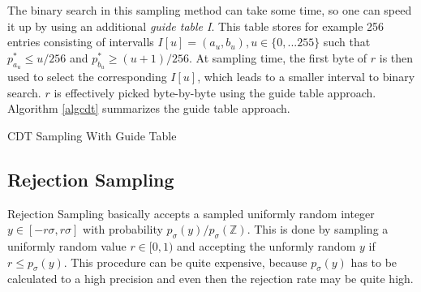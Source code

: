 The binary search in this sampling method can take some time, so one can speed it up by using an additional \textit{guide table I}. This table stores for example 256 entries consisting of intervalls $I[u] = (a_u, b_u), u \in \{0,...255\}$ such that $p^*_{a_{u}} \le u/256$ and $p^*_{b_{u}} \ge (u+1)/256$. At sampling time, the first byte of $r$ is then used to select the corresponding $I[u]$, which leads to a smaller interval to binary search. $r$ is effectively picked byte-by-byte using the guide table approach. Algorithm \ref{algcdt} summarizes the guide table approach.
 \begin{algorithm}
 	\caption{CDT Sampling With Guide Table}
 	\label{algcdt}
 	\begin{algorithmic}[1]
	 		\State
	 	\EndIf
				\State
				\Else
			\EndIf	
		\EndWhile
 	\end{algorithmic}
 \end{algorithm}
\subsection{Rejection Sampling}
Rejection Sampling basically accepts a sampled uniformly random integer $y \in [-r\sigma, r\sigma]$ with probability $p_\sigma(y)/p_\sigma(\mathbb{Z})$. This is done by sampling a uniformly random value $r \in [0,1)$ and accepting the unformly random $y$ if $r \le p_\sigma(y)$. This procedure can be quite expensive, because $p_\sigma(y)$ has to be calculated to a high precision and even then the rejection rate may be quite high.

